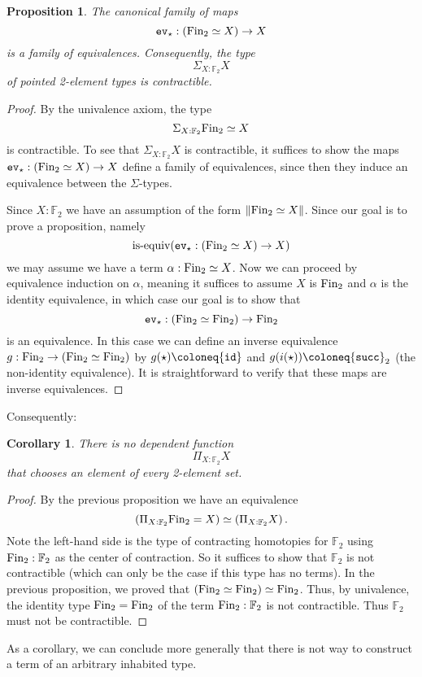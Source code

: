 \documentclass{amsart}
\theoremstyle{theorem}
\newtheorem*{cor}{Corollary}
\newtheorem*{prop}{Proposition}
\theoremstyle{definition}
\theoremstyle{remark}
\newcommand{\0}{\mathbbe{0}}
\newcommand{\1}{\mathbbe{1}}
\newcommand{\2}{\mathbbe{2}}
\newcommand{\3}{\mathbbe{3}}
\newcommand{\4}{\mathbbe{4}}
\newcommand{\FF}{\mathbb{F}}
\newcommand{\term}[1]{{\textup{\texttt{#1}}}}
\newcommand{\type}[1]{{\textup{#1}}}
\newcommand{\id}{\term{id}}
\newcommand{\isequiv}{\type{is-equiv}}
\newcommand{\mere}[1]{\|{#1}\|}
\newcommand{\ev}{\term{ev}}
\newcommand{\Fin}{\type{Fin}}
\begin{document}
\begin{prop} The canonical family of maps
\[ \ev_\star : (\Fin_2 \simeq X) \to X\]
is a family of equivalences. Consequently, the type
\[ \Sigma_{X: \FF_2} X \]
of pointed 2-element types is contractible.
\end{prop}
\begin{proof}
By the univalence axiom, the type
\[ \Sigma_{X: \FF_2} \Fin_2 \simeq X\]
is contractible. To see that $\Sigma_{X : \FF_2} X$ is contractible, it suffices to show the maps $\ev_\star : (\Fin_2\simeq X) \to X$ define a family of equivalences, since then they induce an equivalence between the $\Sigma$-types. 

Since $X : \FF_2$ we have an assumption of the form $\mere{\Fin_2 \simeq X}$. Since our goal is to prove a proposition, namely
\[ \isequiv{ (\ev_\star :  (\Fin_2 \simeq X) \to X)}\]
we may assume we have a term $\alpha : \Fin_2 \simeq X$. Now we can proceed by equivalence induction on $\alpha$, meaning it suffices to assume $X$ is $\Fin_2$ and $\alpha$ is the identity equivalence, in which case our goal is to show that
\[ \ev_\star : (\Fin_2 \simeq \Fin_2) \to \Fin_2\]
is an equivalence. In this case we can define an inverse equivalence $g : \Fin_2 \to (\Fin_2 \simeq \Fin_2)$ by $g(\star) \coloneq \id$ and $g(i(\star)) \coloneq \term{succ}_2$ (the non-identity equivalence). It is straightforward to verify that these maps are inverse equivalences.
\end{proof}

Consequently:

\begin{cor} There is no dependent function
\[ \Pi_{X: \FF_2} X\]
that chooses an element of every 2-element set.
\end{cor}
\begin{proof} By the previous proposition we have an equivalence
\[ \left( \Pi_{X: \FF_2} \Fin_2 = X \right) \simeq \left( \Pi_{X: \FF_2} X \right).\]
Note the left-hand side is the type of contracting homotopies for $\FF_2$ using $\Fin_2 : \FF_2$ as the center of contraction. So it suffices to show that $\FF_2$ is not contractible (which can only be the case if this type has no terms). In the previous proposition, we proved that $(\Fin_2 \simeq \Fin_2) \simeq \Fin_2$. Thus, by univalence, the identity type $\Fin_2 = \Fin_2$ of the term $\Fin_2 : \FF_2$ is not contractible. Thus $\FF_2$ must not be contractible.
\end{proof}

As a corollary, we can conclude more generally that there is not way to construct a term of an arbitrary inhabited type.
\end{document}
